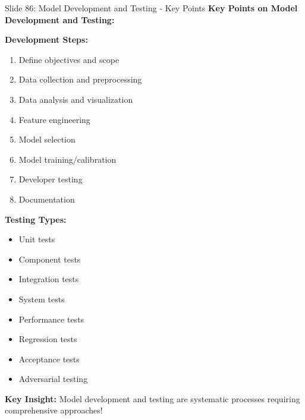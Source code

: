 \documentclass[8pt]{beamer}
\begin{document}
	
	\begin{frame}{Slide 86: Model Development and Testing - Key Points}
		\fontsize{6.5}{7.5}\selectfont
		\textbf{Key Points on Model Development and Testing:}
		
		\vspace{0.1cm}
		\textbf{Development Steps:}
		\begin{enumerate}
			\item Define objectives and scope
			\item Data collection and preprocessing
			\item Data analysis and visualization
			\item Feature engineering
			\item Model selection
			\item Model training/calibration
			\item Developer testing
			\item Documentation
		\end{enumerate}
		
		\vspace{0.1cm}
		\textbf{Testing Types:}
		\begin{itemize}
			\item Unit tests
			\item Component tests
			\item Integration tests
			\item System tests
			\item Performance tests
			\item Regression tests
			\item Acceptance tests
			\item Adversarial testing
		\end{itemize}
		
		\textcolor{myblue}{\textbf{Key Insight:}} Model development and testing are \textcolor{myblue}{systematic processes requiring comprehensive approaches}!
	\end{frame}
	
\end{document}

